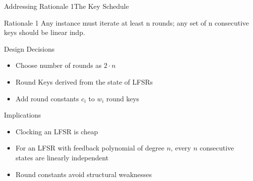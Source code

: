 \begin{frame}{Addressing Rationale 1}{The Key Schedule}
    \vspace{-60pt}
    \begin{minipage}{0.985\textwidth}
    \begin{exampleblock}{Rationale 1}
        Any instance must iterate at least n rounds; any set of n consecutive keys should be linear indp.
    \end{exampleblock}
    \end{minipage}

    \begin{minipage}[t][85pt][t]{0.47\textwidth}
        \begin{block}{Design Decisions}
            \begin{itemize}
                \item Choose number of rounds as $2 \cdot n$\\[5pt]
                \item Round Keys derived from the state of LFSRs\\[5pt]
                \item Add round constants $c_i$ to $w_i$ round keys
            \end{itemize}
        \end{block}
    \end{minipage}
    \hfill
    \begin{minipage}[t][85pt][t]{0.47\textwidth}
        \begin{block}{Implications}
            \begin{itemize}
                \item Clocking an LFSR is cheap
                \item For an LFSR with feedback polynomial of degree $n$, every $n$ consecutive states are linearly independent
                \item Round constants avoid structural weaknesses
            \end{itemize}
        \end{block}
    \end{minipage}
\end{frame}

